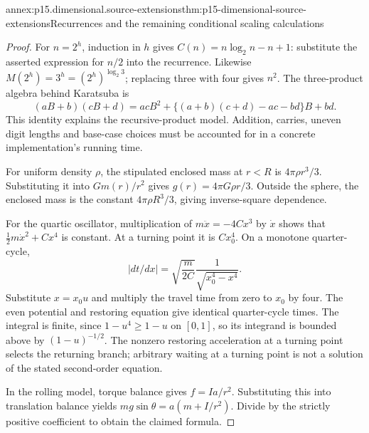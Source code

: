 \begin{annexitem}{annex:p15.dimensional.source-extensions}{thm:p15-dimensional-source-extensions}{Recurrences and the remaining conditional scaling calculations}
\begin{proof}
For \(n=2^h\), induction in \(h\) gives
\(C(n)=n\log_2n-n+1\): substitute the asserted expression for \(n/2\)
into the recurrence. Likewise \(M(2^h)=3^h=(2^h)^{\log_2 3}\);
replacing three with four gives \(n^2\).
The three-product algebra behind Karatsuba is
\[
 (aB+b)(cB+d)
 =acB^2+\{(a+b)(c+d)-ac-bd\}B+bd.
\]
This identity explains the recursive-product model.
Addition, carries, uneven digit lengths and base-case choices must
be accounted for in a concrete implementation's running time.

For uniform density \(\rho\), the stipulated enclosed mass at \(r<R\)
is \(4\pi\rho r^3/3\). Substituting it into \(Gm(r)/r^2\) gives
\(g(r)=4\pi G\rho r/3\). Outside the sphere, the enclosed mass is
the constant \(4\pi\rho R^3/3\), giving inverse-square dependence.

For the quartic oscillator, multiplication of
\(m\ddot x=-4Cx^3\) by \(\dot x\) shows that
\(\frac12m\dot x^2+Cx^4\) is constant. At a turning point it is
\(Cx_0^4\). On a monotone quarter-cycle,
\[
 |dt/dx|=\sqrt{\frac m{2C}}\frac1{\sqrt{x_0^4-x^4}}.
\]
Substitute \(x=x_0u\) and multiply the travel time from zero to \(x_0\)
by four. The even potential and restoring equation give identical
quarter-cycle times. The integral is finite, since
\(1-u^4\geq1-u\) on \([0,1]\), so its integrand is bounded above by
\((1-u)^{-1/2}\). The nonzero restoring acceleration at a turning point
selects the returning branch; arbitrary waiting at a turning point is not
a solution of the stated second-order equation.

In the rolling model, torque balance gives \(f=Ia/r^2\).
Substituting this into translation balance yields
\(mg\sin\theta=a(m+I/r^2)\). Divide by the strictly positive
coefficient to obtain the claimed formula.
\end{proof}
\end{annexitem}

